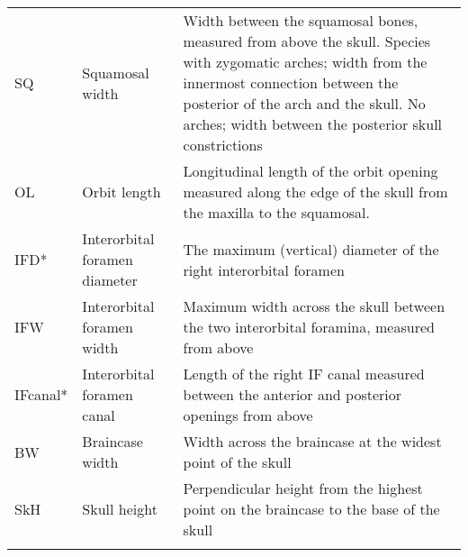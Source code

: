 \begin{center}
\begin{longtable} {p{} p{} p{}}
SQ & Squamosal width & Width between the squamosal bones, measured from above the skull. Species with zygomatic arches; width from the innermost connection between the posterior of the arch and the skull. No arches; width between the posterior skull constrictions \\
OL & Orbit length & Longitudinal length of the orbit opening measured along the edge of the skull from the maxilla to the squamosal. \\
IFD* & Interorbital foramen diameter & The maximum (vertical) diameter of the right interorbital foramen\\
IFW & Interorbital foramen width & Maximum width across the skull between the two interorbital foramina, measured from above\\
IFcanal* & Interorbital foramen canal & Length of the right IF canal measured between the anterior and posterior openings from above\\
BW & Braincase width & Width across the braincase at the widest point of the skull\\
SkH & Skull height & Perpendicular height from the highest point on the braincase to the base of the skull\\
\hline
\label{tab:sk.measurements}

\end{longtable}
\end{center}
\newpage
